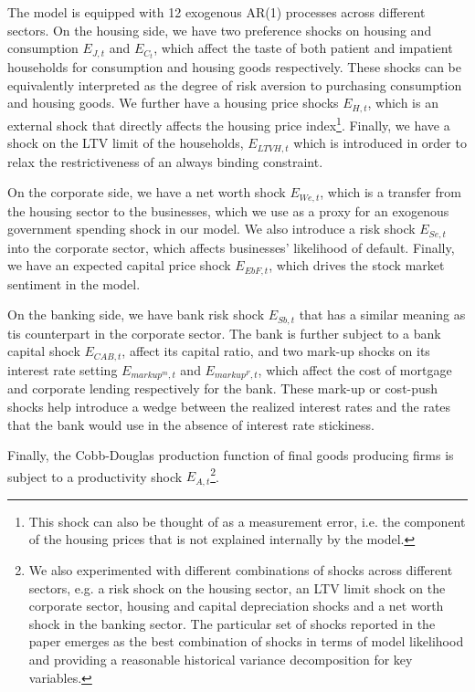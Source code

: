 \documentclass[12pt]{article}
\numberwithin{equation}{section}
\begin{document}
The model is equipped with 12 exogenous AR(1) processes across different sectors. On the housing side, we have two preference shocks on housing and consumption $E_{J,t}$ and $E_{C_t}$, which affect the taste of both patient and impatient households for consumption and housing goods respectively. These shocks can be equivalently interpreted as the degree of risk aversion to purchasing consumption and housing goods. We further have a housing price shocks $E_{H,t}$, which is an external shock that directly affects the housing price index\footnote{This shock can also be thought of as a measurement error, i.e. the component of the housing prices that is not explained internally by the model.}. Finally, we have a shock on the LTV limit of the households, $E_{LTVH,t}$ which is introduced in order to relax the restrictiveness of an always binding constraint. 

On the corporate side, we have a net worth shock $E_{We,t}$, which is a transfer from the housing sector to the businesses, which we use as a proxy for an exogenous government spending shock in our model. We also introduce a risk shock $E_{Se,t}$ into the corporate sector, which affects businesses' likelihood of default. Finally, we have an expected capital price shock $E_{EbF,t}$, which drives the stock market sentiment in the model. 

On the banking side, we have bank risk shock $E_{Sb,t}$ that has a similar meaning  as tis counterpart in the corporate sector. The bank is further subject to a bank capital shock $E_{CAB,t}$, affect its capital ratio, and two mark-up shocks on its interest rate setting $E_{markup^m,t}$ and $E_{markup^F,t}$, which affect the cost of mortgage and corporate lending respectively for the bank. These mark-up or cost-push shocks help introduce a wedge between the realized interest rates and the rates that the bank would use in the absence of interest rate stickiness. 

Finally, the Cobb-Douglas production function of final goods producing firms is subject to a productivity shock $E_{A,t}$\footnote{We also experimented with different combinations of shocks across different sectors, e.g. a risk shock on the housing sector, an LTV limit shock on the corporate sector, housing and capital depreciation shocks and a net worth shock in the banking sector. The particular set of shocks reported in the paper emerges as the best combination of shocks in terms of model likelihood and providing a reasonable historical variance decomposition for key variables.}. 
\end{document}
